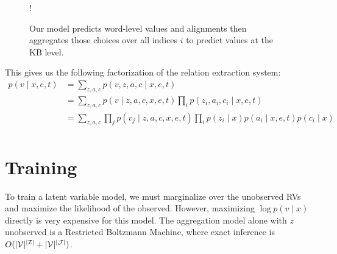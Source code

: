 \documentclass[12pt]{article}
\begin{document}
\begin{figure}[h]
\begin{center}
\resizebox {.3\columnwidth} {!} {
} %
\end{center}
\caption{Our model predicts word-level values and alignments
then aggregates those choices over all indices $i$ to
predict values at the KB level.
}
\label{fig:infmodel}
\end{figure}

This gives us the following factorization of the relation extraction system:
\begin{equation}
\label{eqn:prob}
\begin{aligned}
p(v \mid x,e,t) &= \sum_{z,a,c} p(v,z,a,c\mid x,e,t)\\
&= \sum_{z,a,c} p(v\mid z,a,c,x,e,t) \prod_i p(z_i, a_i, c_i\mid x,e,t)\\
&= \sum_{z,a,c} \prod_j p(v_j\mid z,a,c,x,e,t) \prod_i p(z_i\mid x)p(a_i\mid x,e,t)p(c_i\mid x)\\
\end{aligned}
\end{equation}

\section{Training}
To train a latent variable model, we must marginalize over the unobserved RVs
and maximize the likelihood of the observed.
However, maximizing $\log p(v \mid x)$ directly is very expensive for this model.
The aggregation model alone with $z$ unobserved is a Restricted Boltzmann Machine,
where exact inference is $O(|\mathcal{V}|^{|\mathcal{I}|} + |\mathcal{V}|^{|\mathcal{J}|})$.
\end{document}
